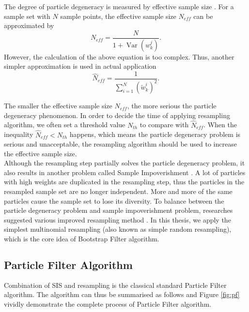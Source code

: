 \documentclass[mstat,12pt]{unswthesis}  %
\numberwithin{equation}{section}
\begin{document}
\noindent The degree of particle degeneracy is measured
by effective  sample  size \cite{kong1992note,liu1998sequential}.
For a sample set with $N$ sample points, 
the effective  sample  size $N_{eff}$ can be
approximated by
\begin{equation}
N_{eff}=\frac{N}{1+\operatorname{Var}\left(w_{k}^{j}\right)}.
\end{equation}
However, the calculation of the above equation is too
complex. Thus, another simpler  approximation is
used in  actual application 
\begin{equation}
\hat{N}_{eff}=\frac{1}{\sum_{i=1}^{N}\left(\tilde{w}_{k}^{i}\right)^{2}}.
\end{equation}

\noindent The smaller the effective  sample  size $N_{eff}$, the more serious the particle degeneracy phenomenon.
In order to decide the time of applying resampling algorithm, we often set a threshold value
$N_{th}$ to  compare with $\hat{N}_{eff}$.
When the inequality $ \hat{N}_{eff} < N_{th}$ happens, which means
the particle degeneracy problem is serious and unacceptable, the resampling algorithm should be used to increase the effective  sample  size.\\

\noindent Although the resampling step partially
solves the  particle degeneracy problem, it also 
results in another problem called Sample
Impoverishment \cite{bolic2005resampling}.
A lot of particles with high weights are duplicated
in the resampling step, thus the particles in the resampled sample set are no longer independent.
More and more of the same particles cause the sample
set to lose its diversity.
To balance between the particle degeneracy problem
and sample impoverishment problem, researches suggested
various improved resampling method \cite{fox2003adapting,sankaranarayanan2008algorithmic,li2012deterministic,balasingam2011efficient}.
In this thesis, we apply the simplest multinomial resampling
(also known as simple random resampling), which is 
the core idea of Bootstrap Filter algorithm.\\

\subsection{Particle Filter Algorithm}
Combination of SIS and resampling is the classical standard
Particle Filter algorithm. The algorithm can thus be summarised as follows and  Figure \ref{fig:pf} vividly demonstrate the complete process of  Particle Filter algorithm.\\
\end{document}
